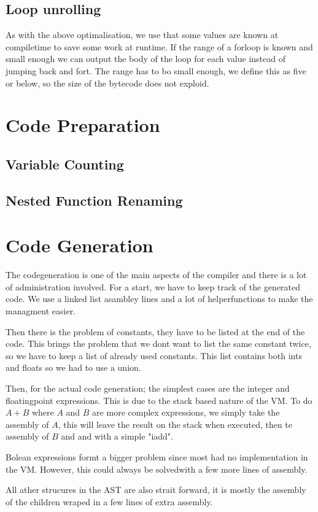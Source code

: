 \documentclass[a4paper,11pt]{report}
\begin{document}
\subsection{Loop unrolling}
As with the above optimalisation, we use that some values are known at compiletime to save some work at runtime.
If the range of a forloop is known and small enough we can output the body of the loop for each value instead of jumping back and fort.
The range has to bo small enough, we define this as five or below, so the size of the bytecode does not exploid.


\section{Code Preparation}
\subsection{Variable Counting}
\subsection{Nested Function Renaming}

\section{Code Generation}
The codegeneration is one of the main aspects of the compiler and there is a lot of administration involved.
For a start, we have to keep track of the generated code.
We use a linked list asambley lines and a lot of helperfunctions to make the managment easier.

Then there is the problem of constants, they have to be listed at the end of the code.
This brings the problem that we dont want to list the same constant twice, so we have to keep a list of already used constants.
This list contains both ints and floats so we had to use a union.
 
Then, for the actual code generation; the simplest cases are the integer and floatingpoint expressions.
This is due to the stack based nature of the VM. To do $A+B$ where $A$ and $B$ are more complex expressions, we simply take the assembly of $A$, this will leave the result on the stack when executed, then te assembly of $B$ and and with a simple "iadd".

Bolean expressions formt a bigger problem since most had no implementation in the VM. However, this could always be solvedwith a few more lines of assembly.

All ather strucures in the AST are also strait forward, it is mostly the assembly of the children wraped in a few lines of extra assembly.
\end{document}
